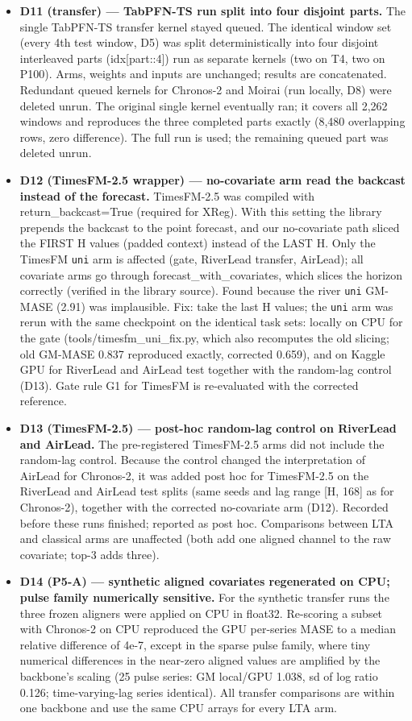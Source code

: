 \begin{itemize}
\item \textbf{D11 (transfer) — TabPFN-TS run split into four disjoint parts.} The single TabPFN-TS transfer kernel stayed queued. The identical window set (every 4th test window, D5) was split deterministically into four disjoint interleaved parts (idx[part::4]) run as separate kernels (two on T4, two on P100). Arms, weights and inputs are unchanged; results are concatenated. Redundant queued kernels for Chronos-2 and Moirai (run locally, D8) were deleted unrun. The original single kernel eventually ran; it covers all 2,262 windows and reproduces the three completed parts exactly (8,480 overlapping rows, zero difference). The full run is used; the remaining queued part was deleted unrun.
\item \textbf{D12 (TimesFM-2.5 wrapper) — no-covariate arm read the backcast instead of the forecast.} TimesFM-2.5 was compiled with return\_backcast=True (required for XReg). With this setting the library prepends the backcast to the point forecast, and our no-covariate path sliced the FIRST H values (padded context) instead of the LAST H. Only the TimesFM \texttt{uni} arm is affected (gate, RiverLead transfer, AirLead); all covariate arms go through forecast\_with\_covariates, which slices the horizon correctly (verified in the library source). Found because the river \texttt{uni} GM-MASE (2.91) was implausible. Fix: take the last H values; the \texttt{uni} arm was rerun with the same checkpoint on the identical task sets: locally on CPU for the gate (tools/timesfm\_uni\_fix.py, which also recomputes the old slicing; old GM-MASE 0.837 reproduced exactly, corrected 0.659), and on Kaggle GPU for RiverLead and AirLead test together with the random-lag control (D13). Gate rule G1 for TimesFM is re-evaluated with the corrected reference.
\item \textbf{D13 (TimesFM-2.5) — post-hoc random-lag control on RiverLead and AirLead.} The pre-registered TimesFM-2.5 arms did not include the random-lag control. Because the control changed the interpretation of AirLead for Chronos-2, it was added post hoc for TimesFM-2.5 on the RiverLead and AirLead test splits (same seeds and lag range [H, 168] as for Chronos-2), together with the corrected no-covariate arm (D12). Recorded before these runs finished; reported as post hoc. Comparisons between LTA and classical arms are unaffected (both add one aligned channel to the raw covariate; top-3 adds three).
\item \textbf{D14 (P5-A) — synthetic aligned covariates regenerated on CPU; pulse family numerically sensitive.} For the synthetic transfer runs the three frozen aligners were applied on CPU in float32. Re-scoring a subset with Chronos-2 on CPU reproduced the GPU per-series MASE to a median relative difference of 4e-7, except in the sparse pulse family, where tiny numerical differences in the near-zero aligned values are amplified by the backbone's scaling (25 pulse series: GM local/GPU 1.038, sd of log ratio 0.126; time-varying-lag series identical). All transfer comparisons are within one backbone and use the same CPU arrays for every LTA arm.

\end{itemize}
